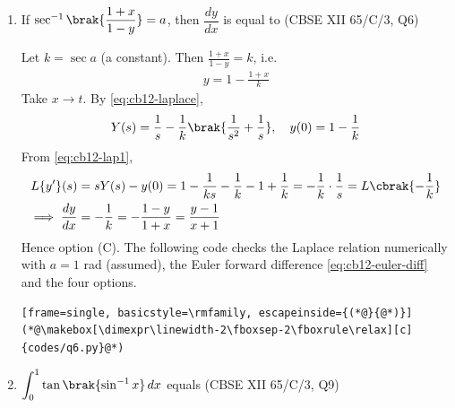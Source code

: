 \begin{enumerate}[label=\thesubsection.\arabic*, ref=\thesubsection.\theenumi,itemsep=0pt]
\item If $\sec^{-1}\brak{\dfrac{1+x}{1-y}} = a$, then $\dfrac{dy}{dx}$ is equal to
\hfill (CBSE XII 65/C/3, Q6)
\begin{enumerate}[itemsep=0pt]
\end{enumerate}

\solution Let $k = \sec a$ (a constant). Then $\frac{1+x}{1-y} = k$, i.e.
\begin{align}
y = 1 - \frac{1+x}{k}
\end{align}
Take $x \to t$. By \eqref{eq:cb12-laplace},
\begin{align}
Y(s) = \frac{1}{s} - \frac{1}{k}\brak{\frac{1}{s^2} + \frac{1}{s}}, \quad y(0) = 1 - \frac{1}{k}
\end{align}
From \eqref{eq:cb12-lap1},
\begin{align}
L\{y'\}(s) &= sY(s) - y(0) = 1 - \frac{1}{ks} - \frac{1}{k} - 1 + \frac{1}{k} = -\frac{1}{k}\cdot\frac{1}{s} = L\cbrak{-\frac{1}{k}} \\
\implies \frac{dy}{dx} &= -\frac{1}{k} = -\frac{1-y}{1+x} = \frac{y-1}{x+1}
\end{align}
Hence option (C). The following code checks the Laplace relation numerically with $a = 1$ rad (assumed), the Euler forward difference \eqref{eq:cb12-euler-diff} and the four options.
\begin{lstlisting}[frame=single, basicstyle=\rmfamily, escapeinside={(*@}{@*)}]
(*@\makebox[\dimexpr\linewidth-2\fboxsep-2\fboxrule\relax][c]{codes/q6.py}@*)
\end{lstlisting}

\item $\displaystyle\int_0^1 \tan\brak{\sin^{-1}x}\,dx$ equals
\hfill (CBSE XII 65/C/3, Q9)
\begin{enumerate}[itemsep=0pt]
\end{enumerate}


\end{enumerate}

